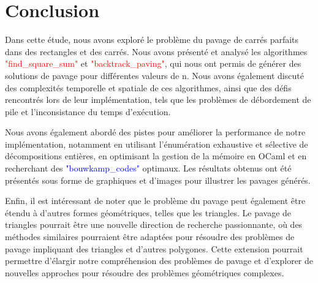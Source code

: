 \documentclass{article}
\begin{document}
\section{Conclusion}

Dans cette étude, nous avons exploré le problème du pavage de carrés parfaits dans des rectangles et des carrés. Nous avons présenté et analysé les algorithmes \textcolor{red}{"find\_square\_sum"} et \textcolor{red}{"backtrack\_paving"}, qui nous ont permis de générer des solutions de pavage pour différentes valeurs de n. Nous avons également discuté des complexités temporelle et spatiale de ces algorithmes, ainsi que des défis rencontrés lors de leur implémentation, tels que les problèmes de débordement de pile et l'inconsistance du temps d'exécution.\newline

Nous avons également abordé des pistes pour améliorer la performance de notre implémentation, notamment en utilisant l'énumération exhaustive et sélective de décompositions entières, en optimisant la gestion de la mémoire en OCaml et en recherchant des \textcolor{blue}{"bouwkamp\_codes"} optimaux. Les résultats obtenus ont été présentés sous forme de graphiques et d'images pour illustrer les pavages générés.\newline

Enfin, il est intéressant de noter que le problème du pavage peut également être étendu à d'autres formes géométriques, telles que les triangles. Le pavage de triangles pourrait être une nouvelle direction de recherche passionnante, où des méthodes similaires pourraient être adaptées pour résoudre des problèmes de pavage impliquant des triangles et d'autres polygones. Cette extension pourrait permettre d'élargir notre compréhension des problèmes de pavage et d'explorer de nouvelles approches pour résoudre des problèmes géométriques complexes.\newline




\end{document}

